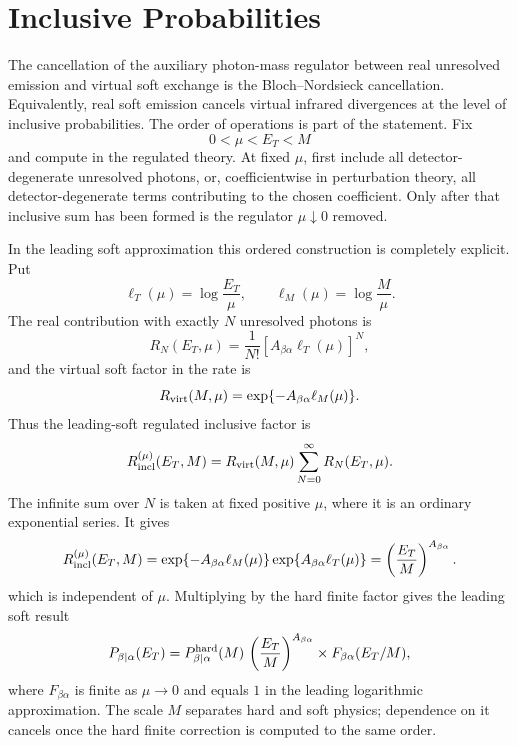 \section{Inclusive Probabilities}
\label{sec:volume-ii-inclusive-probabilities}

The cancellation of the auxiliary photon-mass regulator between real
unresolved emission and virtual soft exchange is the Bloch--Nordsieck
cancellation.  Equivalently, real soft emission cancels virtual infrared
divergences at the level of inclusive probabilities.  The order of operations
is part of the statement.  Fix
\[
  0<\mu<E_T<M
\]
and compute in the regulated theory.  At fixed \(\mu\), first include all
detector-degenerate unresolved photons, or, coefficientwise in perturbation
theory, all detector-degenerate terms contributing to the chosen coefficient.
Only after that inclusive sum has been formed is the regulator
\(\mu\downarrow0\) removed.

In the leading soft approximation this ordered construction is completely
explicit.  Put
\[
  \ell_T(\mu)=\log\frac{E_T}{\mu},
  \qquad
  \ell_M(\mu)=\log\frac{M}{\mu}.
\]
The real contribution with exactly \(N\) unresolved photons is
\[
  R_N(E_T,\mu)
  =
  \frac{1}{N!}
  \left[A_{\beta\alpha}\ell_T(\mu)\right]^N ,
\]
and the virtual soft factor in the rate is
\[
  R_{\rm virt}(M,\mu)
  =
  \exp\{-A_{\beta\alpha}\ell_M(\mu)\}.
\]
Thus the leading-soft regulated inclusive factor is
\[
  R_{\rm incl}^{(\mu)}(E_T,M)
  =
  R_{\rm virt}(M,\mu)
  \sum_{N=0}^\infty R_N(E_T,\mu).
\]
The infinite sum over \(N\) is taken at fixed positive \(\mu\), where it is an
ordinary exponential series.  It gives
\begin{equation}
\begin{aligned}
  R_{\rm incl}^{(\mu)}(E_T,M)
  =
  \exp\{-A_{\beta\alpha}\ell_M(\mu)\}
  \exp\{A_{\beta\alpha}\ell_T(\mu)\}
  =
  \left(\frac{E_T}{M}\right)^{A_{\beta\alpha}} .
\end{aligned}
\label{eq:qed-bloch-nordsieck-inclusive-factorization}
\end{equation}
which is independent of \(\mu\).  Multiplying by the hard finite factor gives
the leading soft result
\[
  P_{\beta|\alpha}(E_T)
  =
  P_{\beta|\alpha}^{\rm hard}(M)\,
  \left(\frac{E_T}{M}\right)^{A_{\beta\alpha}}
  \times
  F_{\beta\alpha}(E_T/M),
\]
where \(F_{\beta\alpha}\) is finite as \(\mu\to0\) and equals \(1\) in the
leading logarithmic approximation.  The scale \(M\) separates hard and soft
physics; dependence on it cancels once the hard finite correction is computed
to the same order.

